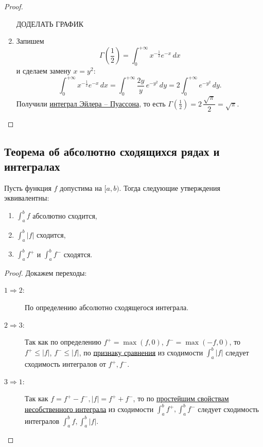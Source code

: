 \begin{proof}
\begin{enumerate}
		ДОДЕЛАТЬ ГРАФИК
		\item Запишем \[
		\Gamma \left(\frac{1}{2} \right) = \int_{0}^{+\infty} x^{-\frac{1}{2}} e^{-x} \, dx
		\]
		и сделаем замену \(x = y^2\): \[
		\int_{0}^{+\infty} x^{-\frac{1}{2}} e^{-x} \, dx = \int_{0}^{+\infty} \frac{2y}{y} \, e^{-y^2} \, dy = 2 \int_{0}^{+\infty} e^{-y^2} \, dy.
		\]
		Получили \hyperlink{puas}{интеграл Эйлера -- Пуассона}, то есть \(\Gamma \left(\frac{1}{2} \right) = 2 \, \dfrac{\sqrt{\pi}}{2} = \sqrt{\pi}\).
	\end{enumerate}
\end{proof}

\subsection{Теорема об абсолютно сходящихся рядах и интегралах}

\begin{ntheorem} \hypertarget{t42}{}
	Пусть функция \(f\) допустима на \([a, b)\). Тогда следующие утверждения эквивалентны:
	\begin{enumerate}
		\item \(\int_{a}^{b} f\) абсолютно сходится,
		\item \(\int_{a}^{b} |f|\) сходится,
		\item \(\int_{a}^{b} f^+\) и \(\int_{a}^{b} f^-\) сходятся.
	\end{enumerate} 
\end{ntheorem}
\begin{proof}
	Докажем переходы:
	\begin{description}
		\item[\(1 \Rightarrow 2\):] По определению абсолютно сходящегося интеграла.
		\item[\(2 \Rightarrow 3\):] Так как по определению \(f^+ = \max (f, 0)\), \(f^- = \max (-f, 0)\), то \(f^+ \leqslant |f|\), \(f^- \leqslant |f|\), по \hyperlink{priz}{признаку сравнения} из сходимости \(\int_{a}^{b} |f|\) следует сходимость интегралов от \(f^+, f^-\).
		\item[\(3 \Rightarrow 1\):] Так как \(f = f^+ - f^-, |f| = f^+ + f^-\), то по \hyperlink{svva}{простейшим свойствам несобственного интеграла} из сходимости \(\int_{a}^{b} f^+, \int_{a}^{b} f^-\) следует сходимость интегралов \(\int_{a}^{b} f, \int_{a}^{b} |f|\).
	\end{description}
\end{proof}

